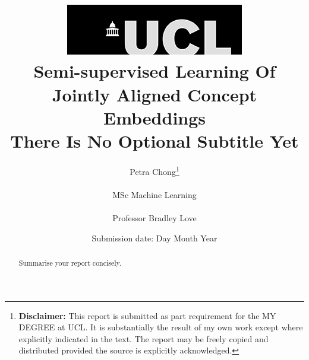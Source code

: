 \documentclass[12pt]{report}
\begin{document}
\title{  	{ \includegraphics[scale=.5]{ucl_logo.png}}\\
{{\Huge Semi-supervised Learning Of Jointly Aligned Concept Embeddings}}\\
{\large There Is No Optional Subtitle Yet}\\
		}
\date{Submission date: Day Month Year}
\author{Petra Chong\thanks{
{\bf Disclaimer:}
This report is submitted as part requirement for the MY DEGREE at UCL. It is
substantially the result of my own work except where explicitly indicated in the text.
The report may be freely copied and distributed provided the source is explicitly acknowledged.
}
\\ \\
MSc Machine Learning\\ \\
Professor Bradley Love}

 
\onehalfspacing
\maketitle
\begin{abstract}
Summarise your report concisely.
\end{abstract}


\tableofcontents
\setcounter{page}{1}













%

\appendix


%
%

\printbibliography
\end{document}

